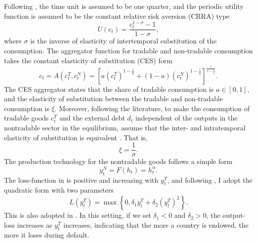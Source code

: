 Following \citet{Na-18}, the time unit is assumed to be one quarter, and the periodic utility function is assumed to be the constant relative risk aversion (CRRA) type
\begin{equation}
    \label{eq:CRRA-utility}
    U(c_t) = \frac{c_t^{1-\sigma} - 1}{1 - \sigma},
\end{equation}
where $\sigma$ is the inverse of elasticity of intertemporal substitution of the consumption.
The aggregator function for tradable and non-tradable consumption takes the constant elasticity of substitution (CES) form
\begin{equation}
    \label{eq:aggregator-function}
    c_t = A(c^T_t, c^N_t) =
        \left[ a \left( c^T_t \right)^{1- \frac{1}{\xi}} +
            (1 - a) \left( c^N_t \right)^{1- \frac{1}{\xi}}
        \right]^{\frac{1}{1 - \frac{1}{\xi}}}.
\end{equation}
The CES aggregator states that the share of tradable consumption is $a \in [0,1]$, and the elasticity of substitution between the tradable and non-tradable consumption is $\xi$.
Moreover, following the literature, to make the consumption of tradable goods $c^T_t$ and the external debt $d_t$ independent of the outputs in the nontradable sector in the equilibrium,
assume that the inter- and intratemporal elasticity of substitution is equivalent \citep*[See][Chapter 9.5]{Uribe-Schmitt-Grohe-textbook}.
That is,
\begin{equation}
    \label{eq:xi-sigma}
    \xi = \frac{1}{\sigma}.
\end{equation}
The production technology for the nontradable goods follows a simple form
\begin{equation}
    \label{eq:production-function}
    y^N_t = F(h_t) = h_t ^\alpha.
\end{equation}
The loss-function in  is positive and increasing with $y^T_t$, and following \citet{Chatterjee-12}, I adopt the quadratic form with two parameters
\begin{equation}
    L(y^T_t) = \max \left\{
        0, \delta_1 y^T_t + \delta_2 \left( y^T_t \right)^2
     \right\}.
\end{equation}
This is also adopted in \citet{Na-18}. In this setting, if we set $\delta_1 < 0$ and $\delta_2 >0$, the output-loss increases as $y^T_t$ increases, indicating that the more a country is endowed, the more it loses during default.